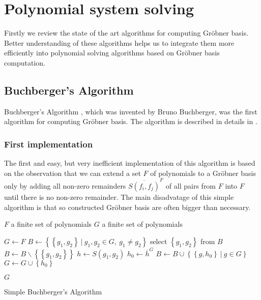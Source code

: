 \chapter{Polynomial system solving}
Firstly we review the state of the art algorithms for computing Gr\"obner basis. Better understanding of these algorithms helps us to integrate them more efficiently into polynomial solving algorithms based on Gr\"obner basis computation.

\section{Buchberger's Algorithm}
Buchberger's Algorithm \cite{Buchberger65}, which was invented by Bruno Buchberger, was the first algorithm for computing Gr\"obner basis. The algorithm is described in details in \cite{Becker93, Cox-Little-Shea97}.

\subsection{First implementation}
The first and easy, but very inefficient implementation of this algorithm is based on the observation that we can extend a set $F$ of polynomials to a Gr\"obner basis only by adding all non-zero remainders $\overline{S(f_i, f_j)}^F$ of all pairs from $F$ into $F$ until there is no non-zero remainder. The main disadvatage of this simple algorithm is that so constructed Gr\"obner basis are often bigger than necessary.

\begin{algorithm}[ht]
  \begin{algorithmic}[1]
    \Require
      \Statex $F$ a finite set of polynomials
    \Ensure
      \Statex $G$ a finite set of polynomials
      \Statex

    \State $G \gets F$
    \State $B \gets \left\{\left\{g_1, g_2\right\}\ |\ g_1, g_2 \in G,\ g_1 \neq g_2\right\}$
      \State select $\left\{g_1, g_2\right\}$ from $B$
      \State $B \gets B\backslash\left\{\left\{g_1, g_2\right\}\right\}$
      \State $h \gets S(g_1, g_2)$
      \State $h_0 \gets \overline{h}^G$
        \State $B \gets B \cup \left\{\left\{g, h_0\right\}\ |\ g\in G\right\}$
        \State $G \gets G \cup \left\{h_0\right\}$
      \EndIf
    \EndWhile

    \State \Return $G$

  \end{algorithmic}
  \caption{Simple Buchberger's Algorithm}
\end{algorithm}

